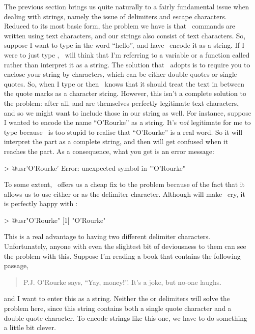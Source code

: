 

The previous section brings us quite naturally to a fairly fundamental issue when dealing with strings, namely the issue of delimiters and escape characters. Reduced to its most basic form, the problem we have is that \R\ commands are written using text characters, and our strings also consist of text characters. So, suppose I want to type in the word ``hello'', and have \R\ encode it as a string. If I were to just type , \R\ will think that I'm referring to a variable or a function called  rather than interpret it as a string. The solution that \R\ adopts is to require you to enclose your string by  characters, which can be either double quotes or single quotes. So, when I type  or  then \R\ knows that it should treat the text in between the quote marks as a character string. However, this isn't a complete solution to the problem: after all,  and  are themselves perfectly legitimate text characters, and so we might want to include those in our string as well. For instance, suppose I wanted to encode the name ``O'Rourke'' as a string. It's {\it not} legitimate for me to type  because \R\ is too stupid to realise that ``O'Rourke'' is a real word. So it will interpret the  part as a complete string, and then will get confused when it reaches the  part. As a consequence, what you get is an error message:
\begin{rblock1}
> @usr{'O'Rourke'}
Error: unexpected symbol in "'O'Rourke"
\end{rblock1}
To some extent, \R\ offers us a cheap fix to the problem because of the fact that it allows us to use either  or  as the delimiter character. Although  will make \R\ cry, it is perfectly happy with :
\begin{rblock1}
> @usr{"O'Rourke"}
[1] "O'Rourke"
\end{rblock1}
This is a real advantage to having two different delimiter characters. Unfortunately, anyone with even the slightest bit of deviousness to them can see the problem with this. Suppose I'm reading a book that contains the following passage,
\begin{quote}
P.J. O'Rourke says, ``Yay, money!''. It's a joke, but no-one laughs.
\end{quote}
and I want to enter this as a string. Neither the  or  delimiters will solve the problem here, since this string contains both a single quote character and a double quote character. To encode strings like this one, we have to do something a little bit clever. 

